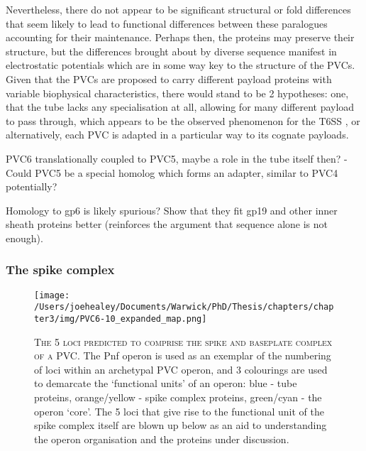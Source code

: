 Nevertheless, there do not appear to be significant structural or fold differences that seem likely to lead to functional differences between these paralogues accounting for their maintenance. Perhaps then, the proteins may preserve their structure, but the differences brought about by diverse sequence manifest in electrostatic potentials which are in some way key to the structure of the PVCs. Given that the PVCs are proposed to carry different payload proteins with variable biophysical characteristics, there would stand to be 2 hypotheses: one, that the tube lacks any specialisation at all, allowing for many different payload to pass through, which appears to be the observed phenomenon for the T6SS , or alternatively, each PVC is adapted in a particular way to its cognate payloads.






PVC6 translationally coupled to PVC5, maybe a role in the tube itself then?
	- Could PVC5 be a special homolog which forms an adapter, similar to PVC4 potentially?

Homology to gp6 is likely spurious? Show that they fit gp19 and other inner sheath proteins better (reinforces the argument that sequence alone is not enough).





\clearpage
\subsubsection{The spike complex}
\begin{figure}[h!]
\texttt{[image: /Users/joehealey/Documents/Warwick/PhD/Thesis/chapters/chapter3/img/PVC6-10\_expanded\_map.png]}
	\captionsetup{singlelinecheck=off, justification=justified, font=footnotesize, aboveskip=10pt}
	\caption[Spike complex protein region of a PVC operon]{\textsc{\normalsize The 5 loci predicted to comprise the spike and baseplate complex of a PVC.}\vspace{0.1cm} \newline The Pnf operon is used as an exemplar of the numbering of loci within an archetypal PVC operon, and 3 colourings are used to demarcate the `functional units' of an operon: blue - tube proteins, orange/yellow - spike complex proteins, green/cyan - the operon `core'. The 5 loci that give rise to the functional unit of the spike complex itself are blown up below as an aid to understanding the operon organisation and the proteins under discussion.}
	\label{PVC6-10map}
\end{figure}


